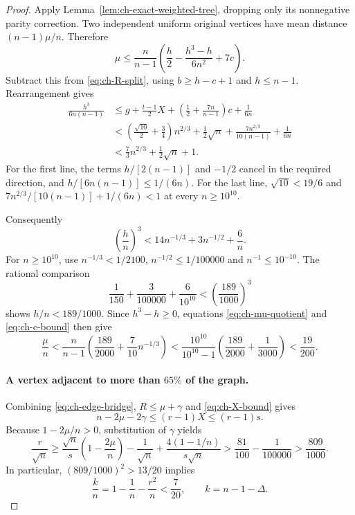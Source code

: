 \documentclass[11pt,a4paper]{article}
\theoremstyle{definition}
\theoremstyle{remark}
\numberwithin{equation}{section}
\begin{document}
\begin{proof}
Apply Lemma~\ref{lem:ch-exact-weighted-tree}, dropping only its nonnegative
parity correction. Two independent uniform original vertices have mean
distance $(n-1)\mu/n$. Therefore
\begin{equation}\label{eq:ch-mu-quotient}
 \mu\le\frac n{n-1}
       \left(\frac h2-\frac{h^3-h}{6n^2}+7c\right).
\end{equation}
Subtract this from \eqref{eq:ch-R-split}, using $b\ge h-c+1$ and
$h\le n-1$. Rearrangement gives
\begin{align}
 \frac{h^3}{6n(n-1)}
 &\le g+\frac{t-1}{2}X+
     \left(\frac12+\frac{7n}{n-1}\right)c+\frac1{6n}
       \label{eq:ch-cubic-before}\\
 &<\left(\frac{\sqrt{10}}2+\frac34\right)n^{2/3}
       +\frac12\sqrt n+\frac{7n^{2/3}}{10(n-1)}+\frac1{6n}
       \nonumber\\
 &<\frac73n^{2/3}+\frac12\sqrt n+1.
       \label{eq:ch-cubic-after}
\end{align}
For the first line, the terms $h/[2(n-1)]$ and $-1/2$ cancel in the
required direction, and $h/[6n(n-1)]\le1/(6n)$. For the last line,
$\sqrt{10}<19/6$ and
$7n^{2/3}/[10(n-1)]+1/(6n)<1$ at every $n\ge10^{10}$.

Consequently
\[
 \left(\frac hn\right)^3
   <14n^{-1/3}+3n^{-1/2}+\frac6n.
\]
For $n\ge10^{10}$, use $n^{-1/3}<1/2100$,
$n^{-1/2}\le1/100000$ and $n^{-1}\le10^{-10}$. The rational comparison
\[
 \frac1{150}+\frac3{100000}+\frac6{10^{10}}
        <\left(\frac{189}{1000}\right)^3
\]
shows $h/n<189/1000$. Since $h^3-h\ge0$, equations
\eqref{eq:ch-mu-quotient} and \eqref{eq:ch-c-bound} then give
\begin{equation}\label{eq:ch-mu-small}
 \frac\mu n
 <\frac n{n-1}\left(\frac{189}{2000}+\frac7{10}n^{-1/3}\right)
 <\frac{10^{10}}{10^{10}-1}
       \left(\frac{189}{2000}+\frac1{3000}\right)
 <\frac{19}{200}.
\end{equation}

\paragraph{A vertex adjacent to more than $65\%$ of the graph.}
Combining \eqref{eq:ch-edge-bridge}, $R\le\mu+\gamma$ and
\eqref{eq:ch-X-bound} gives
\[
 n-2\mu-2\gamma\le(r-1)X\le(r-1)s.
\]
Because $1-2\mu/n>0$, substitution of $\gamma$ yields
\[
 \frac r{\sqrt n}
 \ge \frac{\sqrt n}{s}\left(1-\frac{2\mu}{n}\right)
      -\frac1{\sqrt n}+\frac{4(1-1/n)}{s\sqrt n}
 >\frac{81}{100}-\frac1{100000}>\frac{809}{1000}.
\]
In particular, $(809/1000)^2>13/20$ implies
\begin{equation}\label{eq:ch-k-small}
 \frac{k}{n}=1-\frac1n-\frac{r^2}{n}<\frac7{20},
 \qquad k=n-1-\Delta.
\end{equation}


\end{proof}
\end{document}
